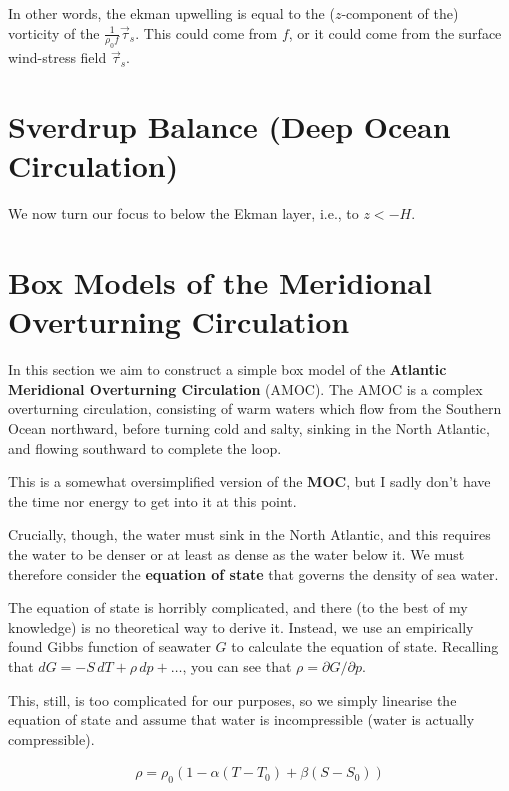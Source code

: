 In other words, the ekman upwelling is equal to the ($z$-component of the) vorticity of the $\frac{1}{\rho_0 f}\vec{\tau}_s$. This could come from $f$, or it could come from the surface wind-stress field $\vec{\tau}_s$. 

\section{Sverdrup Balance (Deep Ocean Circulation)}\label{Sverdrup Balance}

We now turn our focus to below the Ekman layer, i.e., to $z<-H$. 

\section{Box Models of the Meridional Overturning Circulation}\label{MOC}

In this section we aim to construct a simple box model of the \textbf{Atlantic Meridional Overturning Circulation} (AMOC). The AMOC is a complex overturning circulation, consisting of warm waters which flow from the Southern Ocean northward, before turning cold and salty, sinking in the North Atlantic, and flowing southward to complete the loop.

This is a somewhat oversimplified version of the \textbf{MOC}, but I sadly don't have the time nor energy to get into it at this point. 

Crucially, though, the water must sink in the North Atlantic, and this requires the water to be denser or at least as dense as the water below it. We must therefore consider the \textbf{equation of state} that governs the density of sea water.

The equation of state is horribly complicated, and there (to the best of my knowledge) is no theoretical way to derive it. Instead, we use an empirically found Gibbs function of seawater $G$ to calculate the equation of state. Recalling that $dG = -S\,dT + \rho\,dp+\dots$, you can see that $\rho=\partial G/\partial p$.

This, still, is too complicated for our purposes, so we simply linearise the equation of state and assume that water is incompressible (water is actually compressible).

\begin{gather}
    \rho=\rho_0(1-\alpha (T-T_0)+\beta(S-S_0))
\end{gather}